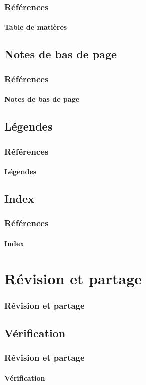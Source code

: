 \documentclass[xcolor=table]{beamer}
\begin{document}
\begin{frame}
\frametitle{Références}
\framesubtitle{Table de matières}

\end{frame}

\subsection{Notes de bas de page}

\begin{frame}
\frametitle{Références}
\framesubtitle{Notes de bas de page}

\end{frame}

\subsection{Légendes}

\begin{frame}
\frametitle{Références}
\framesubtitle{Légendes}

\end{frame}

\subsection{Index}

\begin{frame}
\frametitle{Références}
\framesubtitle{Index}

\end{frame}

\section{Révision et partage}

\begin{frame}
\frametitle{Révision et partage}

\end{frame}

\subsection{Vérification}

\begin{frame}
\frametitle{Révision et partage}
\framesubtitle{Vérification}

\end{frame}
\end{document}
